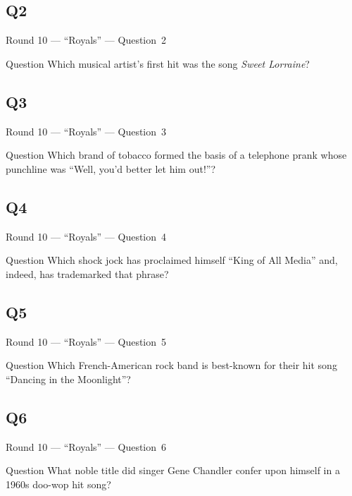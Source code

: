 \documentclass[11pt]{beamer}
\begin{document}
\subsection*{Q2}
\begin{frame}[t]{Round 10 --- ``Royals'' --- \mbox{Question 2}}
\vspace{-0.5em}
\begin{block}{Question}
Which musical artist's first hit was the song \emph{Sweet Lorraine}?
\end{block}
\end{frame}
\subsection*{Q3}
\begin{frame}[t]{Round 10 --- ``Royals'' --- \mbox{Question 3}}
\vspace{-0.5em}
\begin{block}{Question}
Which brand of tobacco formed the basis of a telephone prank whose punchline was ``Well, you'd better let him out!''?
\end{block}
\end{frame}
\subsection*{Q4}
\begin{frame}[t]{Round 10 --- ``Royals'' --- \mbox{Question 4}}
\vspace{-0.5em}
\begin{block}{Question}
Which shock jock has proclaimed himself ``King of All Media'' and, indeed, has trademarked that phrase?
\end{block}
\end{frame}
\subsection*{Q5}
\begin{frame}[t]{Round 10 --- ``Royals'' --- \mbox{Question 5}}
\vspace{-0.5em}
\begin{block}{Question}
Which French-American rock band is best-known for their hit song ``Dancing in the Moonlight''?
\end{block}
\end{frame}
\subsection*{Q6}
\begin{frame}[t]{Round 10 --- ``Royals'' --- \mbox{Question 6}}
\vspace{-0.5em}
\begin{block}{Question}
What noble title did singer Gene Chandler confer upon himself in a 1960s doo-wop hit song?
\end{block}
\end{frame}
\end{document}
